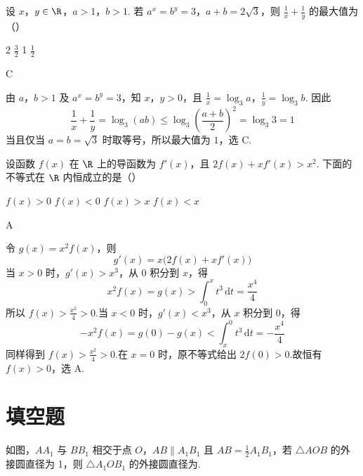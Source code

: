 \begin{problem}
设 \(x\)，\(y \in \R\)，\(a > 1\)，\(b > 1\). 若 \(a^x = b^y = 3\)，\(a + b = 2\sqrt{3}\)，则 \(\frac{1}{x} + \frac{1}{y}\) 的最大值为（\quad）

\choices
    {2}
    {\( \frac{3}{2} \)}
    {1}
    {\(\frac{1}{2}\)}
\end{problem}

\begin{answer}
C
\end{answer}

\begin{solution}
由 \(a\)，\(b>1\) 及 \(a^x=b^y=3\)，知 \(x\)，\(y>0\)，且
\(\frac1x=\log_3a\)，\(\frac1y=\log_3b\).
因此
\[
\frac1x+\frac1y=\log_3(ab)\leqslant\log_3\left(\frac{a+b}{2}\right)^2=\log_3 3=1
\]
当且仅当 \(a=b=\sqrt3\) 时取等号，所以最大值为 \(1\)，选 C.
\end{solution}

\begin{problem}
设函数 \( f(x) \) 在 \(\R\) 上的导函数为 \( f'(x) \)，且 \( 2f(x) + xf'(x) > x^2 \). 下面的不等式在 \(\R\) 内恒成立的是（\quad）

\choices
    {\(f(x) > 0\)}
    {\(f(x) < 0\)}
    {\(f(x) > x\)}
    {\(f(x) < x\)}
\end{problem}

\begin{answer}
A
\end{answer}

\begin{solution}
令 \(g(x)=x^2f(x)\)，则
\[
g'(x)=x\bigl(2f(x)+xf'(x)\bigr)
\]
当 \(x>0\) 时，\(g'(x)>x^3\)，从 \(0\) 积分到 \(x\)，得
\[
x^2f(x)=g(x)>\int_0^x t^3\,\mathrm{d}t=\frac{x^4}{4}
\]
所以 \(f(x)>\frac{x^2}{4}>0\).当 \(x<0\) 时，\(g'(x)<x^3\)，从 \(x\) 积分到 \(0\)，得
\[
-x^2f(x)=g(0)-g(x)<\int_x^0t^3\,\mathrm{d}t=-\frac{x^4}{4}
\]
同样得到 \(f(x)>\frac{x^2}{4}>0\).在 \(x=0\) 时，原不等式给出 \(2f(0)>0\).故恒有 \(f(x)>0\)，选 A.
\end{solution}

\section{填空题}

\begin{problem}
如图，\(AA_{1}\) 与 \(BB_{1}\) 相交于点 \(O\)，\(AB \parallel A_{1}B_{1}\) 且 \(AB = \frac{1}{2} A_{1}B_{1}\)，若 \(\triangle AOB\) 的外接圆直径为 1，则 \(\triangle A_{1}OB_{1}\) 的外接圆直径为\fillinblank{}.
\end{problem}

